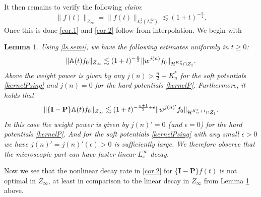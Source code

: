 \documentclass{amsart}
\newtheorem{lemma}{Lemma}[section]
\numberwithin{equation}{section}
\begin{document}
It then remains to verify the following {\it claim}:
\begin{equation}\label{dr.inf.0}
  \|{f}(t)\|_{Z_\infty}= \|{f}(t)\|_{L^2_{v}(L^\infty_x)}\lesssim (1+t)^{-\frac{n}{2}}.
\end{equation}
Once this is done \eqref{cor.1} and \eqref{cor.2} follow from interpolation. We begin with

\begin{lemma}\label{lem.semi.inf}
Using \eqref{ls.semi}, we have the following estimates uniformly in $t\geq 0$:
\begin{equation}\notag
    \|{\mathbb{A}} (t){f}_0\|_{Z_\infty}
    \lesssim
    (1+t)^{-\frac{n}{2}}\|w^{j({n})}{f}_0\|_{{{\mathcal{H}}^{K^*_n}}\cap Z_1}.
\end{equation}
Above the weight power is given by any ${j({n})}>\frac{n}{2}+{K^*_n}$ for the soft potentials  \eqref{kernelPsing} and 
${j({n})}=0$ for the hard potentials  \eqref{kernelP}.  
Furthermore, it holds that
\begin{equation}\notag
    \|\{{\mathbf{I}} - {\mathbf{P}}\}{\mathbb{A}} (t){f}_0\|_{Z_\infty}
    \lesssim
    (1+t)^{-\frac{{n}+1}{2}+\epsilon}\|w^{{j({n})}'}{f}_0\|_{{{\mathcal{H}}^{{K^*_n}+1}}\cap Z_1}.
\end{equation}
In this case the weight power is given by
${j({n})}'=0$ (and $\epsilon=0$) for the hard potentials  \eqref{kernelP}.  
 And for the soft potentials  \eqref{kernelPsing} with any small $\epsilon >0$ we have
 ${j({n})}' = {j({n})}'(\epsilon)>0$ is sufficiently large.  We therefore observe that the microscopic part can have faster linear $L^\infty_x$ decay.  
\end{lemma}

Now we see that the nonlinear decay rate in \eqref{cor.2} for $\{{\mathbf{I}}-{\mathbf{P}}\}{f}(t)$ is not optimal in $Z_\infty$, at least in comparison to the linear decay in $Z_\infty$ from Lemma \ref{lem.semi.inf} above.
\end{document}
